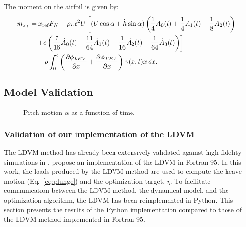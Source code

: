 \documentclass[a4paper,12pt]{article}
\begin{document}
The moment on the airfoil is given by:
\begin{align}
    m_{x_f} &=  x_{\text{ref}} F_N - \rho \pi c^2 U \left[ (U \cos\alpha + \dot{h} \sin\alpha) \left( \frac{1}{4}A_0(t) + \frac{1}{4}A_1(t) - \frac{1}{8}A_2(t) \right) \right. \notag \\
    &\quad \left. + c \left( \frac{7}{16} \dot{A}_0(t) + \frac{11}{64} \dot{A}_1(t) + \frac{1}{16} \dot{A}_2(t) - \frac{1}{64} \dot{A}_3(t) \right) \right] \notag \\
    &\quad - \rho \int_0^c \left( \frac{\partial \phi_{LEV}}{\partial x} + \frac{\partial \phi_{TEV}}{\partial x} \right) \gamma(x, t) x \, dx.
    \label{eq:moment}
\end{align}



\subsection{Model Validation}
\begin{figure}[h]
    \centering
    \caption{Pitch motion $\alpha$ as a function of time.}
    \label{fig:eldredge_function}
\end{figure}

\subsubsection{Validation of our implementation of the LDVM}

The LDVM method has already been extensively validated against high-fidelity simulations in \cite{ramesh2014discrete}.  \cite{ramesh2014discrete} propose an implementation of the LDVM in Fortran 95. 
In this work, the loads produced by the LDVM method are used to compute the heave motion (Eq.~\ref{eq:plunge}) and the optimization target, $\eta$. 
To facilitate communication between the LDVM method, the dynamical model, and the optimization algorithm, the LDVM has been reimplemented in Python. This section presents the results of the Python implementation compared to those of the LDVM method implemented in Fortran 95.
\end{document}
